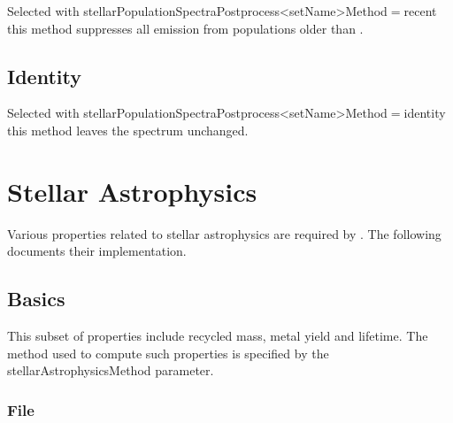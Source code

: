 Selected with {\normalfont \ttfamily stellarPopulationSpectraPostprocess\textless setName\textgreater Method}$=${\normalfont \ttfamily recent} this method suppresses all emission from populations older than {\normalfont \ttfamily [recentPopulationsTimeLimit]}.

\subsection{Identity}\label{phys:spectraPostprocessor:spectraPostprocessorIdentity}

Selected with {\normalfont \ttfamily stellarPopulationSpectraPostprocess\textless setName\textgreater Method}$=${\normalfont \ttfamily identity} this method leaves the spectrum unchanged.

\section{Stellar Astrophysics}

Various properties related to stellar astrophysics are required by \glc. The following documents their implementation.

\subsection{Basics}

This subset of properties include recycled mass, metal yield and lifetime.  The method used to compute such properties is specified by the {\normalfont \ttfamily stellarAstrophysicsMethod} parameter.

\subsubsection{File}\label{sec:StellarAstrophysicsFile}

